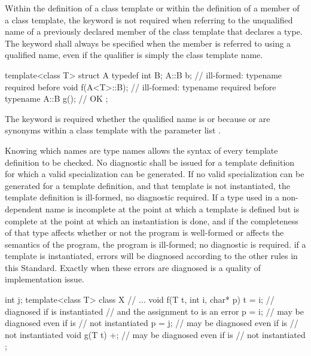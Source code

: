 \pnum
Within the definition of a class template or within the definition of a
member of a class template, the keyword 
is not required when referring to the unqualified name of a previously
declared member of the class template that declares a type.
The keyword  shall always be specified when the member
is referred to using a qualified name, even if the qualifier is simply
the class template name.
\enterexample

\begin{codeblock}
template<class T> struct A {
    typedef int B;
    A::B b;			// ill-formed: typename required before 
    void f(A<T>::B);		// ill-formed: typename required before 
    typename A::B g();		// OK
};
\end{codeblock}

The keyword  is required whether the qualified name is
 or  because  or  are synonyms
within a class template with the parameter list .
\exitexample

\pnum
{}%
%
Knowing which names are type names allows the syntax of every template
definition to be checked.
No diagnostic shall be issued for a template
definition for which a valid specialization can be generated.
If no valid specialization can be generated
for a template definition,
and that template is not instantiated, the template definition is ill-formed,
no diagnostic required.
If a type used in a non-dependent name is incomplete
at the point at which a template is defined but is
complete at the point at which an instantiation is done,
and if the completeness of that type affects whether or
not the program is well-formed or affects the semantics
of the program, the program is ill-formed; no diagnostic
is required.
\enternote
if a template is instantiated, errors will be diagnosed according
to the other rules in this Standard.
Exactly when these errors are diagnosed is a quality of implementation issue.
\exitnote
\enterexample

\begin{codeblock}
int j;
template<class T> class X {
	// ...
	void f(T t, int i, char* p)
	{
		t = i;		// diagnosed if  is instantiated
				// and the assignment to  is an error
		p = i;		// may be diagnosed even if  is
				// not instantiated
		p = j;		// may be diagnosed even if  is
				// not instantiated
	}
	void g(T t) {
		+;		// may be diagnosed even if  is
				// not instantiated
	}
};
\end{codeblock}
\exitexampleb

